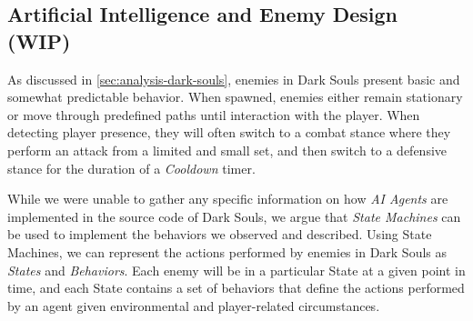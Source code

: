 




\subsection{Artificial Intelligence and Enemy Design (WIP)}


As discussed in \ref{sec:analysis-dark-souls}, enemies in Dark Souls present basic and somewhat predictable behavior. When spawned, enemies either remain stationary or move through predefined paths until interaction with the player. When detecting player presence, they will often switch to a combat stance where they perform an attack from a limited and small set, and then switch to a defensive stance for the duration of a \emph{Cooldown} timer.

While we were unable to gather any specific information on how \emph{AI Agents} are implemented in the source code of Dark Souls, we argue that \emph{State Machines} can be used to implement the behaviors we observed and described. Using State Machines, we can represent the actions performed by enemies in Dark Souls as \emph{States} and \emph{Behaviors}. Each enemy will be in a particular State at a given point in time, and each State contains a set of behaviors that define the actions performed by an agent given environmental and player-related circumstances.

